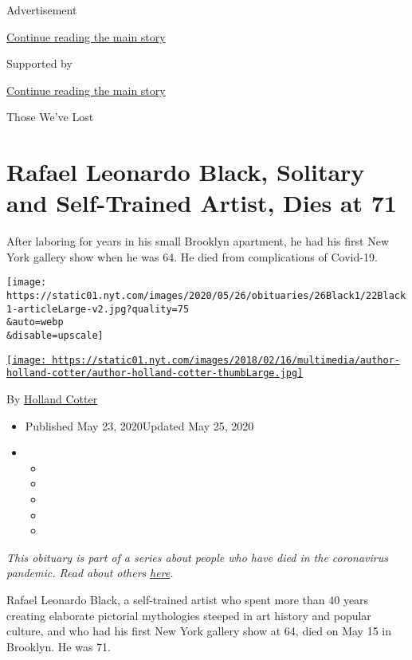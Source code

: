 Advertisement

\protect\hyperlink{after-top}{Continue reading the main story}

Supported by

\protect\hyperlink{after-sponsor}{Continue reading the main story}

Those We've Lost

\hypertarget{rafael-leonardo-black-solitary-and-self-trained-artist-dies-at-71}{%
\section{Rafael Leonardo Black, Solitary and Self-Trained Artist, Dies
at
71}\label{rafael-leonardo-black-solitary-and-self-trained-artist-dies-at-71}}

After laboring for years in his small Brooklyn apartment, he had his
first New York gallery show when he was 64. He died from complications
of Covid-19.

\texttt{[image: https://static01.nyt.com/images/2020/05/26/obituaries/26Black1/22Black1-articleLarge-v2.jpg?quality=75\\\&auto=webp\\\&disable=upscale]}

\href{https://www.nytimes.com/by/holland-cotter}{\texttt{[image: https://static01.nyt.com/images/2018/02/16/multimedia/author-holland-cotter/author-holland-cotter-thumbLarge.jpg]}}

By \href{https://www.nytimes.com/by/holland-cotter}{Holland Cotter}

\begin{itemize}
\item
  Published May 23, 2020Updated May 25, 2020
\item
  \begin{itemize}
  \item
  \item
  \item
  \item
  \item
  \end{itemize}
\end{itemize}

\emph{This obituary is part of a series about people who have died in
the coronavirus pandemic. Read about others}
\href{https://www.nytimes.com/series/people-who-have-died-of-the-coronavirus}{\emph{here}}\emph{.}

Rafael Leonardo Black, a self-trained artist who spent more than 40
years creating elaborate pictorial mythologies steeped in art history
and popular culture, and who had his first New York gallery show at 64,
died on May 15 in Brooklyn. He was 71.

